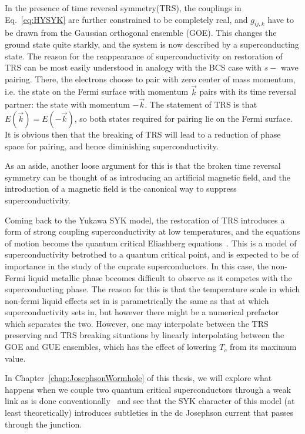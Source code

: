 \par
In the presence of time reversal symmetry(TRS), the couplings in Eq.~\eqref{eq:HYSYK} are further constrained to be completely real, and $g_{ij,k}$ have to be drawn from the Gaussian orthogonal ensemble (GOE). This changes the ground state quite starkly, and the system is now described by a superconducting state. 
The reason for the reappearance of superconductivity on restoration of TRS can be most easily understood in analogy with the BCS case with $s-$ wave pairing. There, the electrons choose to pair with zero center of mass momentum, i.e. the state on the Fermi surface with momentum $\vec{k}$ pairs with its time reversal partner: the state with momentum $-\vec{k}$. The statement of TRS is that $E(\vec{k}) = E(-\vec{k})$, so both states required for pairing lie on the Fermi surface. It is obvious then that the breaking of TRS will lead to a reduction of phase space for pairing, and hence diminishing superconductivity.
\par
As an aside, another loose argument for this is that the broken time reversal symmetry can be thought of as introducing an artificial magnetic field, and the introduction of a magnetic field is the canonical way to suppress superconductivity.  
\par 
Coming back to the Yukawa SYK model, the restoration of TRS introduces a form of strong coupling superconductivity at low temperatures, and the equations of motion become the quantum critical Eliashberg equations~\cite{metlitski2015cooper,chubukov2020interplay,abanov2020interplay,she2009bcs}. This is a model of superconductivity betrothed to a quantum critical point, and is expected to be of importance in the study of the cuprate superconductors.
In this case, the non-Fermi liquid metallic phase becomes difficult to observe as it competes with the superconducting phase. The reason for this is that the temperature scale in which non-fermi liquid effects set in is parametrically the same as that at which superconductivity sets in, but however there might be a numerical prefactor which separates the two. However, one may interpolate between the TRS preserving and TRS breaking situations by linearly interpolating between the GOE and GUE ensembles, which has the effect of lowering $T_c$ from its maximum value. 
\par
In Chapter~\ref{chap:JosephsonWormhole} of this thesis, we will explore what happens when we couple two quantum critical superconductors through a weak link as is done conventionally~\cite{ambegaokar1963tunneling} and see that the SYK character of this model (at least theoretically) introduces subtleties in the dc Josephson current that passes through the junction.
 
